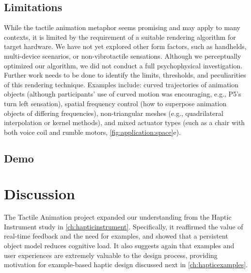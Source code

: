 \subsection{Limitations}
While the tactile animation metaphor seems promising and may apply to many contexts, it is limited by the requirement of a suitable rendering algorithm for target hardware.
We have not yet explored other form factors, such as handhelds, multi-device scenarios, or non-vibrotactile sensations.
Although we perceptually optimized our algorithm, we did not conduct a full psychophysical investigation.
Further work needs to be done to identify the limits, thresholds, and peculiarities of this rendering technique.
Examples include:
curved trajectories of animation objects (although participants' use of curved motion was encouraging, e.g., P5's turn left sensation),
spatial frequency control (how to superpose animation objects of differing frequencies),
non-triangular meshes (e.g., quadrilateral interpolation or kernel methods),
and mixed actuator types (such as a chair with both voice coil and rumble motors, \autoref{fig:application:space}e).




\subsection{Demo}

\section{Discussion}
The Tactile Animation project expanded our understanding from the Haptic Instrument study in \autoref{ch:hapticinstrument}.
Specifically, it reaffirmed the value of real-time feedback and the need for examples, and showed that a persistent object model reduces cognitive load.
It also suggests again that examples and user experiences are extremely valuable to the design process, providing motivation for example-based haptic design discussed next in \autoref{ch:hapticexamples}.




